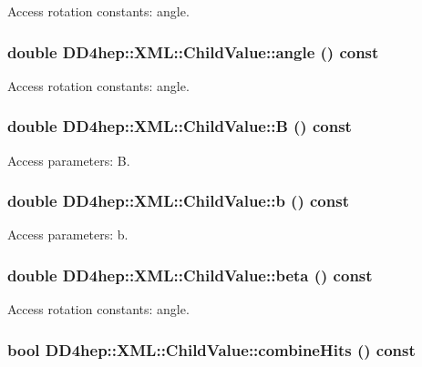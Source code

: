 Access rotation constants: angle. \hypertarget{struct_d_d4hep_1_1_x_m_l_1_1_child_value_ab42e9be4cb1e7441f943320b03fc5d70}{
\subsubsection[{angle}]{\setlength{\rightskip}{0pt plus 5cm}double DD4hep::XML::ChildValue::angle () const}}
\label{struct_d_d4hep_1_1_x_m_l_1_1_child_value_ab42e9be4cb1e7441f943320b03fc5d70}


Access rotation constants: angle. \hypertarget{struct_d_d4hep_1_1_x_m_l_1_1_child_value_a2516147098ab12b0e0f1b3c9990da43d}{
\subsubsection[{B}]{\setlength{\rightskip}{0pt plus 5cm}double DD4hep::XML::ChildValue::B () const}}
\label{struct_d_d4hep_1_1_x_m_l_1_1_child_value_a2516147098ab12b0e0f1b3c9990da43d}


Access parameters: B. \hypertarget{struct_d_d4hep_1_1_x_m_l_1_1_child_value_a701852719ab1dad71e2b90bb92d67e84}{
\subsubsection[{b}]{\setlength{\rightskip}{0pt plus 5cm}double DD4hep::XML::ChildValue::b () const}}
\label{struct_d_d4hep_1_1_x_m_l_1_1_child_value_a701852719ab1dad71e2b90bb92d67e84}


Access parameters: b. \hypertarget{struct_d_d4hep_1_1_x_m_l_1_1_child_value_a118eec3b47c16c56c520a6d45b72e2c5}{
\subsubsection[{beta}]{\setlength{\rightskip}{0pt plus 5cm}double DD4hep::XML::ChildValue::beta () const}}
\label{struct_d_d4hep_1_1_x_m_l_1_1_child_value_a118eec3b47c16c56c520a6d45b72e2c5}


Access rotation constants: angle. \hypertarget{struct_d_d4hep_1_1_x_m_l_1_1_child_value_ad81ec7ed5759f9eff9d15737529e3c82}{
\subsubsection[{combineHits}]{\setlength{\rightskip}{0pt plus 5cm}bool DD4hep::XML::ChildValue::combineHits () const}}
\label{struct_d_d4hep_1_1_x_m_l_1_1_child_value_ad81ec7ed5759f9eff9d15737529e3c82}


